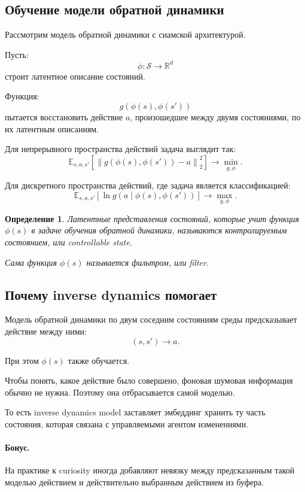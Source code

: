 \documentclass[12pt,a4paper]{article}
\newtheorem{definition}{Определение}
\begin{document}
\subsection{Обучение модели обратной динамики}

Рассмотрим модель обратной динамики с сиамской архитектурой.

Пусть:
\[
\phi:\mathcal S\to\mathbb R^d
\]
строит латентное описание состояний.

Функция:
\[
g(\phi(s),\phi(s'))
\]
пытается восстановить действие $a$, произошедшее между двумя состояниями, по их латентным описаниям.

Для непрерывного пространства действий задача выглядит так:
\[
\mathbb E_{s,a,s'}
\left[
\left\|
g(\phi(s),\phi(s'))-a
\right\|_2^2
\right]
\to
\min_{g,\phi}.
\]

Для дискретного пространства действий, где задача является классификацией:
\[
\mathbb E_{s,a,s'}
\left[
\ln g(a\mid \phi(s),\phi(s'))
\right]
\to
\max_{g,\phi}.
\]

\begin{definition}
Латентные представления состояний, которые учит функция $\phi(s)$ в задаче обучения обратной динамики, называются контролируемым состоянием, или controllable state.

Сама функция $\phi(s)$ называется фильтром, или filter.
\end{definition}

\subsection{Почему inverse dynamics помогает}

Модель обратной динамики по двум соседним состояниям среды предсказывает действие между ними:
\[
(s,s')
\longrightarrow
a.
\]

При этом $\phi(s)$ также обучается.

Чтобы понять, какое действие было совершено, фоновая шумовая информация обычно не нужна. Поэтому она отбрасывается самой моделью.

То есть inverse dynamics model заставляет эмбеддинг хранить ту часть состояния, которая связана с управляемыми агентом изменениями.

\paragraph{Бонус.}

На практике к curiosity иногда добавляют невязку между предсказанным такой моделью действием и действительно выбранным действием из буфера.
\end{document}
